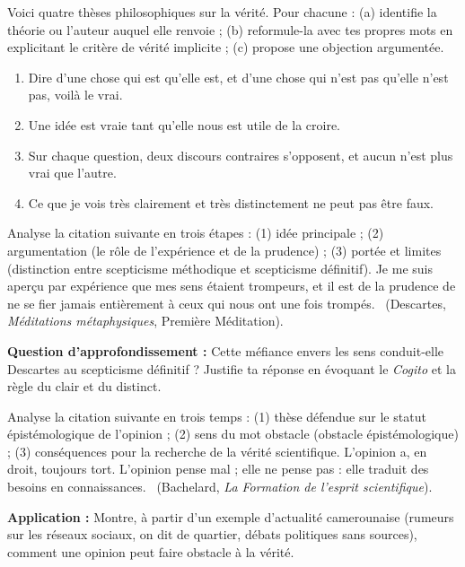 \documentclass[11pt]{article}
\newcounter{popsec}
\newcounter{popsub}
\newcommand{\courssub}[1]{%
  \stepcounter{popsub}%
  \par\vspace{9pt}\noindent{\popxbold\fontsize{11.5}{13}\selectfont\color{popink}{\color{poporange}\thepopsec.\thepopsub}\hspace{6pt}#1}\par\nopagebreak\vspace{4pt}
}
\begin{document}
\courssub{Je m'entraîne}

\begin{exercice}
Voici quatre thèses philosophiques sur la vérité. Pour chacune : (a) identifie la théorie ou l'auteur auquel elle renvoie ; (b) reformule-la avec tes propres mots en explicitant le critère de vérité implicite ; (c) propose une objection argumentée.
\begin{enumerate}
\item \guillemotleft Dire d'une chose qui est qu'elle est, et d'une chose qui n'est pas qu'elle n'est pas, voilà le vrai. \guillemotright
\item \guillemotleft Une idée est vraie tant qu'elle nous est utile de la croire. \guillemotright
\item \guillemotleft Sur chaque question, deux discours contraires s'opposent, et aucun n'est plus vrai que l'autre. \guillemotright
\item \guillemotleft Ce que je vois très clairement et très distinctement ne peut pas être faux. \guillemotright
\end{enumerate}
\end{exercice}

\begin{exercice}
Analyse la citation suivante en trois étapes : (1) idée principale ; (2) argumentation (le rôle de l'expérience et de la prudence) ; (3) portée et limites (distinction entre scepticisme méthodique et scepticisme définitif).
\guillemotleft Je me suis aperçu par expérience que mes sens étaient trompeurs, et il est de la prudence de ne se fier jamais entièrement à ceux qui nous ont une fois trompés. \guillemotright\ (Descartes, \emph{Méditations métaphysiques}, Première Méditation).

\textbf{Question d'approfondissement :} Cette méfiance envers les sens conduit-elle Descartes au scepticisme définitif ? Justifie ta réponse en évoquant le \emph{Cogito} et la règle du clair et du distinct.
\end{exercice}

\begin{exercice}
Analyse la citation suivante en trois temps : (1) thèse défendue sur le statut épistémologique de l'opinion ; (2) sens du mot \guillemotleft obstacle \guillemotright (obstacle épistémologique) ; (3) conséquences pour la recherche de la vérité scientifique.
\guillemotleft L'opinion a, en droit, toujours tort. L'opinion pense mal ; elle ne pense pas : elle traduit des besoins en connaissances. \guillemotright\ (Bachelard, \emph{La Formation de l'esprit scientifique}).

\textbf{Application :} Montre, à partir d'un exemple d'actualité camerounaise (rumeurs sur les réseaux sociaux, \guillemotleft on dit \guillemotright de quartier, débats politiques sans sources), comment une \guillemotleft opinion \guillemotright peut faire obstacle à la vérité.
\end{exercice}
\end{document}
